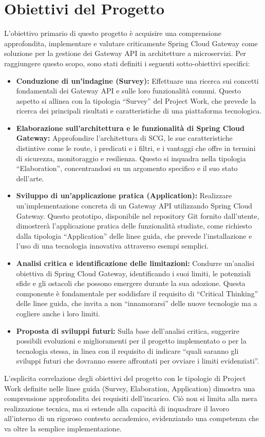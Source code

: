 \section{Obiettivi del Progetto}

L'obiettivo primario di questo progetto è acquisire una comprensione approfondita, implementare e valutare criticamente Spring Cloud Gateway come soluzione per la gestione dei Gateway API in architetture a microservizi. Per raggiungere questo scopo, sono stati definiti i seguenti sotto-obiettivi specifici:
\begin{itemize}
    \item \textbf{Conduzione di un'indagine (Survey):} Effettuare una ricerca sui concetti fondamentali dei Gateway API e sulle loro funzionalità comuni. Questo aspetto si allinea con la tipologia \enquote{Survey} del Project Work, che prevede la ricerca dei principali risultati e caratteristiche di una piattaforma tecnologica.
    \item \textbf{Elaborazione sull'architettura e le funzionalità di Spring Cloud Gateway:} Approfondire l'architettura di SCG, le sue caratteristiche distintive come le route, i predicati e i filtri, e i vantaggi che offre in termini di sicurezza, monitoraggio e resilienza. Questo si inquadra nella tipologia \enquote{Elaboration}, concentrandosi su un argomento specifico e il suo stato dell'arte.
    \item \textbf{Sviluppo di un'applicazione pratica (Application):} Realizzare un'implementazione concreta di un Gateway API utilizzando Spring Cloud Gateway. Questo prototipo, disponibile nel repository Git fornito dall'utente, dimostrerà l'applicazione pratica delle funzionalità studiate, come richiesto dalla tipologia \enquote{Application} delle linee guida, che prevede l'installazione e l'uso di una tecnologia innovativa attraverso esempi semplici.
    \item \textbf{Analisi critica e identificazione delle limitazioni:} Condurre un'analisi obiettiva di Spring Cloud Gateway, identificando i suoi limiti, le potenziali sfide e gli ostacoli che possono emergere durante la sua adozione. Questa componente è fondamentale per soddisfare il requisito di \enquote{Critical Thinking} delle linee guida, che invita a non \enquote{innamorarsi} delle nuove tecnologie ma a cogliere anche i loro limiti.
    \item \textbf{Proposta di sviluppi futuri:} Sulla base dell'analisi critica, suggerire possibili evoluzioni e miglioramenti per il progetto implementato o per la tecnologia stessa, in linea con il requisito di indicare \enquote{quali saranno gli sviluppi futuri che dovranno essere affrontati per ovviare i limiti evidenziati}.
\end{itemize}
L'esplicita correlazione degli obiettivi del progetto con le tipologie di Project Work definite nelle linee guida (Survey, Elaboration, Application) dimostra una comprensione approfondita dei requisiti dell'incarico. Ciò non si limita alla mera realizzazione tecnica, ma si estende alla capacità di inquadrare il lavoro all'interno di un rigoroso contesto accademico, evidenziando una competenza che va oltre la semplice implementazione.

